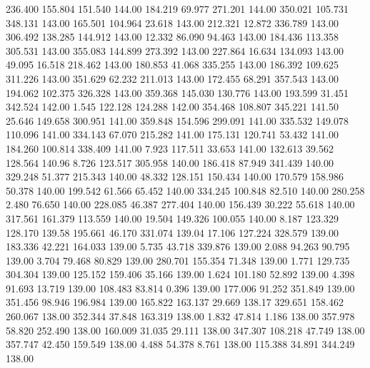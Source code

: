  236.400  155.804  151.540       144.00
 184.219   69.977  271.201       144.00
 350.021  105.731  348.131       143.00
 165.501  104.964   23.618       143.00
 212.321   12.872  336.789       143.00
 306.492  138.285  144.912       143.00
  12.332   86.090   94.463       143.00
 184.436  113.358  305.531       143.00
 355.083  144.899  273.392       143.00
 227.864   16.634  134.093       143.00
  49.095   16.518  218.462       143.00
 180.853   41.068  335.255       143.00
 186.392  109.625  311.226       143.00
 351.629   62.232  211.013       143.00
 172.455   68.291  357.543       143.00
 194.062  102.375  326.328       143.00
 359.368  145.030  130.776       143.00
 193.599   31.451  342.524       142.00
   1.545  122.128  124.288       142.00
 354.468  108.807  345.221       141.50
  25.646  149.658  300.951       141.00
 359.848  154.596  299.091       141.00
 335.532  149.078  110.096       141.00
 334.143   67.070  215.282       141.00
 175.131  120.741   53.432       141.00
 184.260  100.814  338.409       141.00
   7.923  117.511   33.653       141.00
 132.613   39.562  128.564       140.96
   8.726  123.517  305.958       140.00
 186.418   87.949  341.439       140.00
 329.248   51.377  215.343       140.00
  48.332  128.151  150.434       140.00
 170.579  158.986   50.378       140.00
 199.542   61.566   65.452       140.00
 334.245  100.848   82.510       140.00
 280.258    2.480   76.650       140.00
 228.085   46.387  277.404       140.00
 156.439   30.222   55.618       140.00
 317.561  161.379  113.559       140.00
  19.504  149.326  100.055       140.00
   8.187  123.329  128.170       139.58
 195.661   46.170  331.074       139.04
  17.106  127.224  328.579       139.00
 183.336   42.221  164.033       139.00
   5.735   43.718  339.876       139.00
   2.088   94.263   90.795       139.00
   3.704   79.468   80.829       139.00
 280.701  155.354   71.348       139.00
   1.771  129.735  304.304       139.00
 125.152  159.406   35.166       139.00
   1.624  101.180   52.892       139.00
   4.398   91.693   13.719       139.00
 108.483   83.814    0.396       139.00
 177.006   91.252  351.849       139.00
 351.456   98.946  196.984       139.00
 165.822  163.137   29.669       138.17
 329.651  158.462  260.067       138.00
 352.344   37.848  163.319       138.00
   1.832   47.814    1.186       138.00
 357.978   58.820  252.490       138.00
 160.009   31.035   29.111       138.00
 347.307  108.218   47.749       138.00
 357.747   42.450  159.549       138.00
   4.488   54.378    8.761       138.00
 115.388   34.891  344.249       138.00
